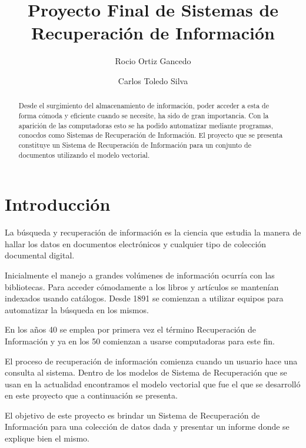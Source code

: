 \documentclass[runningheads]{llncs}
\begin{document}
	\hyphenation{}
	
	\title{Proyecto Final de Sistemas de Recuperaci\'on de Informaci\'on}
	
	\author{Rocio Ortiz Gancedo \and Carlos Toledo Silva}
	
	
	
	\maketitle
	
	\begin{abstract}
		Desde el surgimiento del almacenamiento de información, poder acceder a esta de forma cómoda y eficiente cuando se necesite, ha sido de gran importancia. Con la aparición de las computadoras esto se ha podido automatizar mediante programas, conocdos como Sistemas de Recuperación de Información. El proyecto que se presenta constituye un Sistema de Recuperación de Información para un conjunto de documentos utilizando el modelo vectorial.
	\end{abstract}

	\section{Introducci\'on}
La búsqueda y recuperación de información es la ciencia que estudia la manera de hallar los datos en documentos electrónicos y cualquier tipo de colección documental digital. 

Inicialmente el manejo a grandes volúmenes de información ocurría con las bibliotecas. Para acceder cómodamente a los libros y artículos se mantenían indexados usando catálogos. Desde 1891 se comienzan a utilizar equipos para automatizar la búsqueda en los mismos. 

En los años 40 se emplea por primera vez el término Recuperación de Información y ya en los 50 comienzan a usarse computadoras para este fin.
 
El proceso de recuperación de información comienza cuando un usuario hace una consulta al sistema. Dentro de los modelos de Sistema de Recuperación que se usan en la actualidad encontramos el modelo vectorial que fue el que se desarrolló en este proyecto que a continuación se presenta.

El objetivo de este proyecto es brindar un Sistema de Recuperación de Información para una colección de datos dada y presentar un informe donde se explique bien el mismo.
\end{document}
